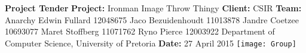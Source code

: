 \begin{titlepage}
	\begin{center}
		\large{\textbf{Project Tender}}\newline
		\vfill
		\LARGE{\textbf{Project:} Ironman Image Throw Thingy}\newline
		\textbf{Client:} CSIR\newline
		\vfill
		\LARGE{\textbf{Team:} Anarchy}\newline
		\large{Edwin Fullard 12048675}\newline
		\large{Jaco Bezuidenhoudt 11013878}\newline
		\large{Jandre Coetzee 10693077}\newline
		\large{Maret Stoffberg 11071762}\newline
		\large{Ryno Pierce 12003922}\newline
		\small{Department of Computer Science, University of Pretoria}\newline
		\vfill
		\large{\textbf{Date:} 27 April 2015}
		\vfill
		\texttt{[image: Group]}
	\end{center}
\end{titlepage}
